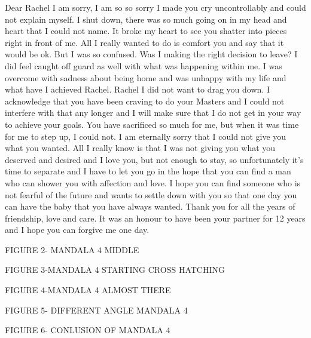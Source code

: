 Dear Rachel 
I am sorry, I am so so sorry I made you cry uncontrollably and could not explain myself. I shut down, there was so much going on in my head and heart that I could not name. It broke my heart to see you shatter into pieces right in front of me. All I really wanted to do is comfort you and say that it would be ok. But I was so confused. Was I making the right decision to leave? I did feel caught off guard as well with what was happening within me. I was overcome with sadness about being home and was unhappy with my life and what have I achieved Rachel. Rachel I did not want to drag you down. I acknowledge that you have been craving to do your Masters and I could not interfere with that any longer and I will make sure that I do not get in your way to achieve your goals. You have sacrificed so much for me, but when it was time for me to step up, I could not. I am eternally sorry that I could not give you what you wanted. All I really know is that I was not giving you what you deserved and desired and I love you, but not enough to stay, so unfortunately it's time to separate and I have to let you go in the hope that you can find a man who can shower you with affection and love. I hope you can find someone who is not fearful of the future and wants to settle down with you so that one day you can have the baby that you have always wanted. 
Thank you for all the years of friendship, love and care. 
It was an honour to have been your partner for 12 years and I hope you can forgive me one day.

FIGURE 2- MANDALA 4 MIDDLE

FIGURE 3-MANDALA 4 STARTING CROSS HATCHING

FIGURE 4-MANDALA 4 ALMOST THERE

FIGURE 5- DIFFERENT ANGLE MANDALA 4

FIGURE 6- CONLUSION OF MANDALA 4

